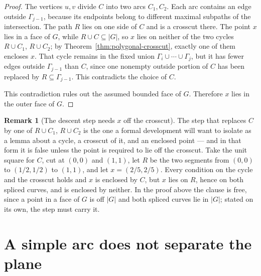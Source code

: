 \documentclass[11pt]{article}
\theoremstyle{mainplain}
\theoremstyle{mainroman}
\theoremstyle{definition}
\newtheorem{remark}[theorem]{Remark}
\numberwithin{equation}{section}
\begin{document}
\begin{proof}
The vertices $u,v$ divide $C$ into two arcs $C_1,C_2$. Each arc
contains an edge outside $\Gamma_{j-1}$, because its endpoints belong
to different maximal subpaths of the intersection. The path $R$ lies
on one side of $C$ and is a crosscut there. The point $x$ lies in a
face of $G$, while $R\cup C\subseteq|G|$, so $x$ lies on neither of
the two cycles $R\cup C_1$, $R\cup C_2$; by
Theorem~\ref{thm:polygonal-crosscut}, exactly one of them encloses
$x$. That cycle remains in the fixed
union $\Gamma_i\cup\cdots\cup\Gamma_j$, but it has fewer edges outside
$\Gamma_{j-1}$ than $C$, since one nonempty outside portion of $C$ has
been replaced by $R\subseteq\Gamma_{j-1}$. This contradicts the choice
of $C$.

This contradiction rules out the assumed bounded face of $G$.
Therefore $x$ lies in the outer face of $G$.
\end{proof}

\begin{remark}[The descent step needs $x$ off the crosscut]\label{rem:outer-chain-descent}
The step that replaces $C$ by one of $R\cup C_1$, $R\cup C_2$ is the
one a formal development will want to isolate as a lemma about a
cycle, a crosscut of it, and an enclosed point --- and in that form it
is false unless the point is required to lie off the crosscut. Take
the unit square for $C$, cut at $(0,0)$ and $(1,1)$, let $R$ be the
two segments from $(0,0)$ to $(1/2,1/2)$ to $(1,1)$, and let
$x=(2/5,2/5)$. Every condition on the cycle and the crosscut holds and
$x$ is enclosed by $C$, but $x$ lies on $R$, hence on both spliced
curves, and is enclosed by neither. In the proof above the clause is
free, since a point in a face of $G$ is off $|G|$ and both spliced
curves lie in $|G|$; stated on its own, the step must carry it.
\end{remark}

\section{A simple arc does not separate the plane}
\end{document}
